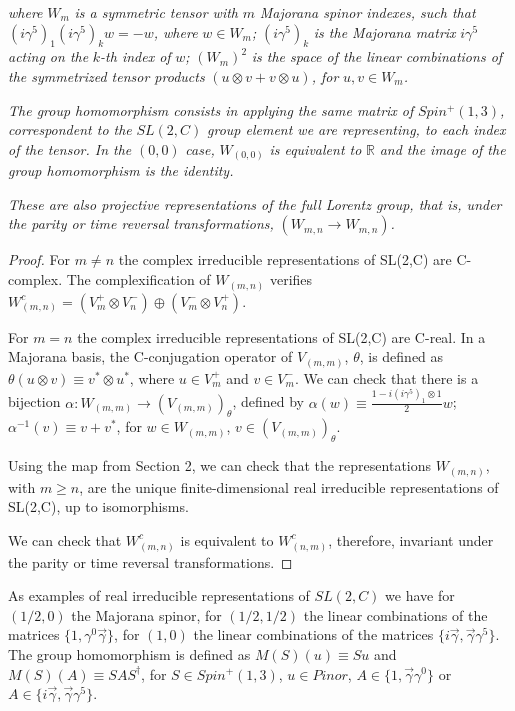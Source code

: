 \documentclass[11pt]{book}
\begin{document}
\emph{ where }\(W_m\)\emph{ is a symmetric tensor with }\(m\)\emph{
Majorana spinor indexes, such that
}\((i\gamma^5)_{1}(i\gamma^5)_{k}w=-w\)\emph{, where
}\(w\in W_m\)\emph{; }\((i\gamma^5)_{k}\)\emph{ is the Majorana matrix
}\(i\gamma^5\)\emph{ acting on the }\(k\)\emph{-th index of
}\(w\)\emph{; }\((W_m)^2\)\emph{ is the space of the linear combinations
of the symmetrized tensor products }\((u\otimes v+v\otimes u)\)\emph{,
for }\(u,v\in W_m\)\emph{.}

\emph{The group homomorphism consists in applying the same matrix of
}\(Spin^+(1,3)\)\emph{, correspondent to the }\(SL(2,C)\)\emph{ group
element we are representing, to each index of the tensor. In the
}\((0,0)\)\emph{ case, }\(W_{(0,0)}\)\emph{ is equivalent to
}\(\mathbb{R}\)\emph{ and the image of the group homomorphism is the
identity.}

\emph{These are also projective representations of the full Lorentz
group, that is, under the parity or time reversal transformations,
}\((W_{m,n}\to W_{m,n})\)\emph{.}

\emph{Proof.} For \(m\neq n\) the complex irreducible representations of
SL(2,C) are C-complex. The complexification of \(W_{(m,n)}\) verifies
\(W_{(m,n)}^c=(V^+_m\otimes V^-_n)\oplus (V^-_m\otimes V^+_n)\).

For \(m=n\) the complex irreducible representations of SL(2,C) are
C-real. In a Majorana basis, the C-conjugation operator of
\(V_{(m,m)}\), \(\theta\), is defined as
\(\theta(u\otimes v)\equiv v^*\otimes u^*\), where \(u\in V^+_m\) and
\(v\in V^-_m\). We can check that there is a bijection
\(\alpha:W_{(m,m)}\to
(V_{(m,m)})_\theta\), defined by
\(\alpha(w)\equiv \frac{1-i(i\gamma^5)_1\otimes 1}{2}w\);
\(\alpha^{-1}(v)\equiv v+v^*\), for \(w\in W_{(m,m)}\),
\(v\in (V_{(m,m)})_\theta\).

Using the map from Section 2, we can check that the representations
\(W_{(m,n)}\), with \(m\geq n\), are the unique finite-dimensional real
irreducible representations of SL(2,C), up to isomorphisms.

We can check that \(W_{(m,n)}^c\) is equivalent to \(W_{(n,m)}^c\),
therefore, invariant under the parity or time reversal
transformations.~◻

As examples of real irreducible representations of \(SL(2,C)\) we have
for \((1/2,0)\) the Majorana spinor, for \((1/2,1/2)\) the linear
combinations of the matrices \(\{1,\gamma^0\vec{\gamma}\}\), for
\((1,0)\) the linear combinations of the matrices
\(\{i\vec{\gamma},\vec{\gamma}\gamma^5\}\). The group homomorphism is
defined as \(M(S)(u)\equiv Su\) and \(M(S)(A)\equiv S A S^\dagger\), for
\(S\in Spin^+(1,3)\), \(u\in Pinor\),
\(A\in \{1,\vec{\gamma}\gamma^0\}\) or \(A\in
\{i\vec{\gamma},\vec{\gamma}\gamma^5\}\).
\end{document}
